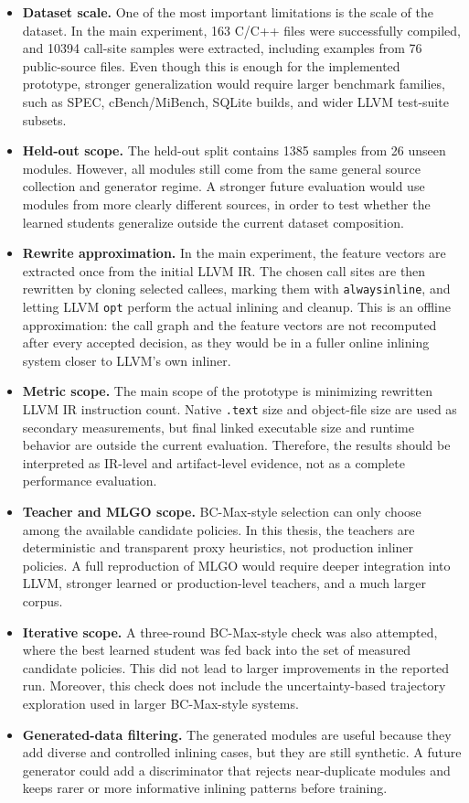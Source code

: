 \documentclass[12pt, a4paper]{report}
\begin{document}
\begingroup
\small
\begin{itemize}
\setlength{\itemsep}{2pt}
  \item \textbf{Dataset scale.} One of the most important limitations is the
  scale of the dataset. In the main experiment, 163 C/C++ files were
  successfully compiled, and 10394 call-site samples were extracted, including
  examples from 76 public-source files. Even though this is enough for the
  implemented prototype, stronger generalization would require larger benchmark
  families, such as SPEC, cBench/MiBench, SQLite builds, and wider LLVM test-suite
  subsets.
  \item \textbf{Held-out scope.} The held-out split contains 1385 samples from
  26 unseen modules. However, all modules still come from the same general
  source collection and generator regime. A stronger future evaluation would
  use modules from more clearly different sources, in order to test whether the
  learned students generalize outside the current dataset composition.
  \item \textbf{Rewrite approximation.} In the main experiment, the feature
  vectors are extracted once from the initial LLVM IR. The chosen call sites are then
  rewritten by cloning selected callees, marking them with
  \texttt{alwaysinline}, and letting LLVM \texttt{opt} perform the actual
  inlining and cleanup. This is an offline approximation: the call graph and the
  feature vectors are not recomputed after every accepted decision, as they
  would be in a fuller online inlining system closer to LLVM's own inliner.
  \item \textbf{Metric scope.} The main scope of the prototype is minimizing
  rewritten LLVM IR instruction count. Native \texttt{.text} size and
  object-file size are used as secondary measurements, but final linked
  executable size and runtime behavior are outside the current evaluation.
  Therefore, the results should be interpreted as IR-level and artifact-level
  evidence, not as a complete performance evaluation.
  \item \textbf{Teacher and MLGO scope.} BC-Max-style selection can only choose
  among the available candidate policies. In this thesis, the teachers are
  deterministic and transparent proxy heuristics, not production inliner
  policies. A full reproduction of MLGO would require deeper integration into
  LLVM, stronger learned or production-level teachers, and a much larger corpus.
  \item \textbf{Iterative scope.} A three-round BC-Max-style check was also
  attempted, where the best learned student was fed back into the set of
  measured candidate policies. This did not lead to larger improvements in the
  reported run. Moreover, this check does not include the uncertainty-based
  trajectory exploration used in larger BC-Max-style systems.
  \item \textbf{Generated-data filtering.} The generated modules are useful
  because they add diverse and controlled inlining cases, but they are still
  synthetic. A future generator could add a discriminator that rejects
  near-duplicate modules and keeps rarer or more informative inlining patterns
  before training.
\end{itemize}
\endgroup
\end{document}
